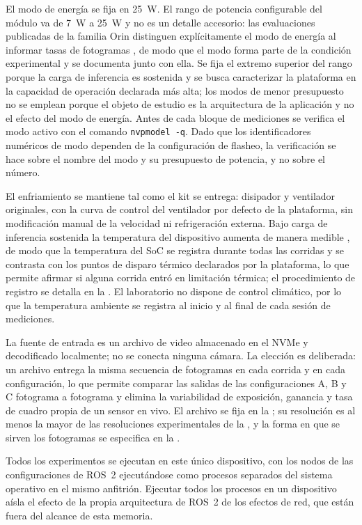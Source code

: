El modo de energía se fija en 25~W. El rango de potencia configurable del
módulo va de 7~W a 25~W \cite{nvidiacorporation2024} y no es un detalle
accesorio: las evaluaciones publicadas de la familia Orin distinguen
explícitamente el modo de energía al informar tasas de fotogramas
\cite{scalcon2024}, de modo que el modo forma parte de la condición
experimental y se documenta junto con ella. Se fija el extremo superior del
rango porque la carga de inferencia es sostenida y se busca caracterizar la
plataforma en la capacidad de operación declarada más alta; los modos de
menor presupuesto no se emplean porque el objeto de estudio es la
arquitectura de la aplicación y no el efecto del modo de energía. Antes de
cada bloque de mediciones se verifica el modo activo con el comando
\texttt{nvpmodel -q}. Dado que los identificadores numéricos de modo
dependen de la configuración de flasheo, la verificación se hace sobre el
nombre del modo y su presupuesto de potencia, y no sobre el número.

El enfriamiento se mantiene tal como el kit se entrega: disipador y
ventilador originales, con la curva de control del ventilador por defecto de
la plataforma, sin modificación manual de la velocidad ni refrigeración
externa. Bajo carga de inferencia sostenida la temperatura del dispositivo
aumenta de manera medible \cite{tang2026}, de modo que la temperatura del
SoC se registra durante todas las corridas y se contrasta con los puntos de
disparo térmico declarados por la plataforma, lo que permite afirmar si
alguna corrida entró en limitación térmica; el procedimiento de registro se
detalla en la . El laboratorio no dispone de
control climático, por lo que la temperatura ambiente se registra al inicio
y al final de cada sesión de mediciones.

La fuente de entrada es un archivo de video almacenado en el NVMe y
decodificado localmente; no se conecta ninguna cámara. La elección es
deliberada: un archivo entrega la misma secuencia de fotogramas en cada
corrida y en cada configuración, lo que permite comparar las salidas de las
configuraciones A, B y C fotograma a fotograma y elimina la variabilidad de
exposición, ganancia y tasa de cuadro propia de un sensor en vivo. El
archivo se fija en la ; su resolución es al menos
la mayor de las resoluciones experimentales de la
, y la forma en que se sirven los fotogramas se
especifica en la .

Todos los experimentos se ejecutan en este único dispositivo, con los nodos
de las configuraciones de ROS~2 ejecutándose como procesos separados del
sistema operativo en el mismo anfitrión. Ejecutar todos los procesos en un
dispositivo aísla el efecto de la propia arquitectura de ROS~2 de los
efectos de red, que están fuera del alcance de esta memoria.

